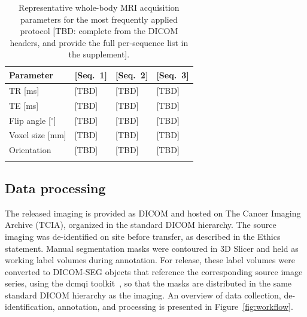 \begin{table}[h]
\caption{Representative whole-body MRI acquisition parameters for the most frequently applied protocol [TBD: complete from the DICOM headers, and provide the full per-sequence list in the supplement].}\label{tab:acq}
\begin{tabular}{@{}llll@{}}
\toprule
Parameter & [Seq.\ 1] & [Seq.\ 2] & [Seq.\ 3] \\
\midrule
TR [ms]               & [TBD] & [TBD] & [TBD] \\
TE [ms]               & [TBD] & [TBD] & [TBD] \\
Flip angle [$^\circ$] & [TBD] & [TBD] & [TBD] \\
Voxel size [mm]       & [TBD] & [TBD] & [TBD] \\
Orientation           & [TBD] & [TBD] & [TBD] \\
\botrule
\end{tabular}
\end{table}

\subsection*{Data processing}\label{subsec:curation}
The released imaging is provided as DICOM and hosted on The Cancer Imaging Archive (TCIA), organized in the standard DICOM hierarchy.
The source imaging was de-identified on site before transfer, as described in the Ethics statement.
Manual segmentation masks were contoured in 3D Slicer and held as working label volumes during annotation.
For release, these label volumes were converted to DICOM-SEG objects that reference the corresponding source image series, using the dcmqi toolkit~\cite{Herz_2017}, so that the masks are distributed in the same standard DICOM hierarchy as the imaging.
An overview of data collection, de-identification, annotation, and processing is presented in Figure~\ref{fig:workflow}.

